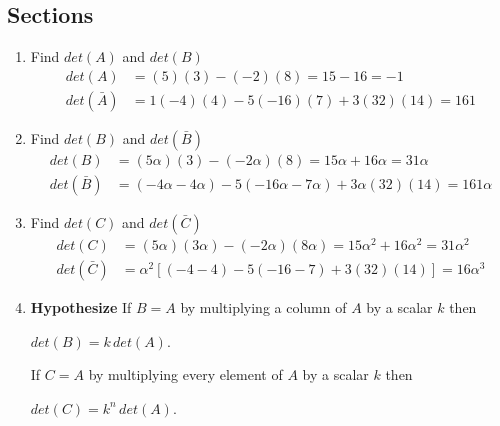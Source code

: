 \documentclass{article}
\begin{document}
    \subsection{Sections}
    \begin{enumerate}[label=(\alph*)]
      \item Find $det(A)$ and $det(B)$
            \begin{align*}
              det(A)&=(5)(3)-(-2)(8)=15-16=-1 \\
              det(\bar{A})&=1(-4)(4)-5(-16)(7)+3(32)(14)=161
            \end{align*}
      \item Find $det(B)$ and $det(\bar{B})$
            \begin{align*}
              det(B)&=(5\alpha)(3)-(-2\alpha)(8)=15\alpha+16\alpha=31\alpha \\
              det(\bar{B})&=(-4\alpha-4\alpha)-5(-16\alpha-7\alpha)+3\alpha(32)(14)=161\alpha
            \end{align*}
      \item Find $det(C)$ and $det(\bar{C})$
            \begin{align*}
              det(C)&=(5\alpha)(3\alpha)-(-2\alpha)(8\alpha)=15\alpha^2+16\alpha^2=31\alpha^2 \\
              det(\bar{C})&=\alpha^{2}[(-4-4)-5(-16-7)+3(32)(14)]=16\alpha^{3}
            \end{align*}
      \item \textbf{Hypothesize}
            \newline
            If $B=A$ by multiplying a column of $A$ by a scalar $k$ then 
            \begin{center}
              $det(B)=k\,det(A)$.
            \end{center}
            If $C=A$ by multiplying every element of $A$ by a scalar $k$ then
            \begin{center}
              $det(C)=k^n\,det(A)$.
            \end{center}

    \end{enumerate}
\end{document}
